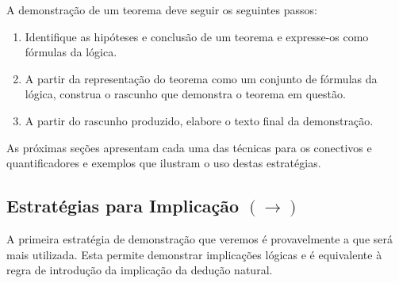 A demonstração de um teorema deve seguir os seguintes passos:
\begin{enumerate}
  \item Identifique as hipóteses e conclusão de um teorema e
    expresse-os como fórmulas da lógica.
  \item A partir da representação do teorema como um conjunto de
    fórmulas da lógica, construa o rascunho que demonstra o teorema
    em questão.
  \item A partir do rascunho produzido, elabore o texto final da demonstração.
\end{enumerate}

As próximas seções apresentam
cada uma das técnicas para os conectivos e quantificadores e exemplos
que ilustram o uso destas estratégias.

\subsection{Estratégias para Implicação $(\to)$}

A primeira estratégia de demonstração que veremos é provavelmente a
que será  mais utilizada. Esta permite demonstrar implicações lógicas
e é equivalente à regra de introdução da implicação da dedução
natural.

